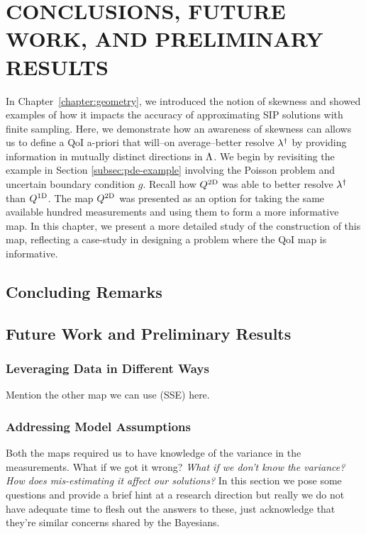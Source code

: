 \chapter{\uppercase{Conclusions, Future Work, and Preliminary Results} \label{chapter:future}}


In Chapter~\ref{chapter:geometry}, we introduced the notion of skewness and showed examples of how it impacts the accuracy of approximating SIP solutions with finite sampling.
Here, we demonstrate how an awareness of skewness can allows us to define a QoI a-priori that will\---on average\---better resolve $\lambda^\dagger$ by providing information in mutually distinct directions in ${\Lambda}$.
We begin by revisiting the example in Section \ref{subsec:pde-example} involving the Poisson problem and uncertain boundary condition $g$.
Recall how $Q^\text{2D}$ was able to better resolve $\lambda^\dagger$ than $Q^\text{1D}$.
The map $Q^\text{2D}$ was presented as an option for taking the same available hundred measurements and using them to form a more informative map.
In this chapter, we present a more detailed study of the construction of this map, reflecting a case-study in designing a problem where the QoI map is informative.

\section{Concluding Remarks}

\section{Future Work and Preliminary Results}


\FloatBarrier



\subsection{Leveraging Data in Different Ways}\label{sec:ch05-data}
Mention the other map we can use (SSE) here.

\subsection{Addressing Model Assumptions}\label{sec:ch05-variance}
Both the maps required us to have knowledge of the variance in the measurements.
What if we got it wrong?
\emph{What if we don't know the variance? How does mis-estimating it affect our solutions?}
In this section we pose some questions and provide a brief hint at a research direction but really we do not have adequate time to flesh out the answers to these, just acknowledge that they're similar concerns shared by the Bayesians.

